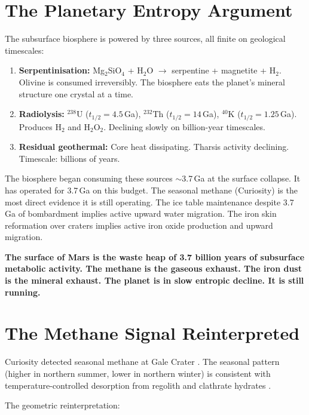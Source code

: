 \documentclass[11pt, a4paper]{article}
\begin{document}
\section{The Planetary Entropy Argument}

The subsurface biosphere is powered by
three sources, all finite on geological
timescales:

\begin{enumerate}[leftmargin=*, label=(\arabic*)]
\item \textbf{Serpentinisation:}
  Mg$_2$SiO$_4$ + H$_2$O $\rightarrow$
  serpentine + magnetite + H$_2$.
  Olivine is consumed irreversibly.
  The biosphere eats the planet's
  mineral structure one crystal at a time.

\item \textbf{Radiolysis:}
  $^{238}$U ($t_{1/2} = 4.5$\,Ga),
  $^{232}$Th ($t_{1/2} = 14$\,Ga),
  $^{40}$K ($t_{1/2} = 1.25$\,Ga).
  Produces H$_2$ and H$_2$O$_2$.
  Declining slowly on billion-year
  timescales.

\item \textbf{Residual geothermal:}
  Core heat dissipating.
  Tharsis activity declining.
  Timescale: billions of years.
\end{enumerate}

The biosphere began consuming these sources
$\sim$3.7\,Ga at the surface collapse.
It has operated for 3.7\,Ga on this budget.
The seasonal methane (Curiosity) is the
most direct evidence it is still operating.
The ice table maintenance despite
3.7\,Ga of bombardment implies active
upward water migration.
The iron skin reformation over craters
implies active iron oxide production
and upward migration.

\textbf{The surface of Mars is the waste
heap of 3.7 billion years of subsurface
metabolic activity.
The methane is the gaseous exhaust.
The iron dust is the mineral exhaust.
The planet is in slow entropic decline.
It is still running.}

\section{The Methane Signal Reinterpreted}

Curiosity detected seasonal methane at
Gale Crater \cite{webster2018}.
The seasonal pattern (higher in northern
summer, lower in northern winter) is
consistent with temperature-controlled
desorption from regolith and clathrate
hydrates \cite{moores2019}.

The geometric reinterpretation:
\end{document}
